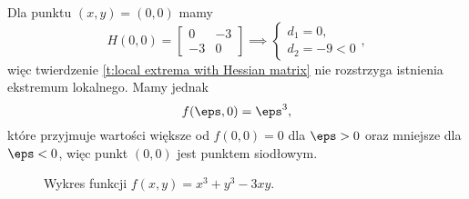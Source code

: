 \begin{solution}
    Dla punktu $(x, y) = (0, 0)$ mamy
    \[ H(0, 0) = \begin{bmatrix}
        0 & -3 \\
        -3 & 0
    \end{bmatrix} \implies \begin{cases} d_1 = 0,\\ d_2 = -9 < 0 \end{cases}, \]
    więc twierdzenie \ref{t:local extrema with Hessian matrix} nie rozstrzyga istnienia ekstremum lokalnego. Mamy jednak
    \[ f(\eps, 0) = \eps^3, \]
    które przyjmuje wartości większe od $f(0, 0) = 0$ dla $\eps > 0$ oraz mniejsze dla $\eps < 0$, więc punkt $(0, 0)$ jest punktem siodłowym.
\end{solution}

\begin{figure}[H]
    \centering
    \caption{Wykres funkcji $f(x, y) = x^3 + y^3 - 3xy$.}
\end{figure}

